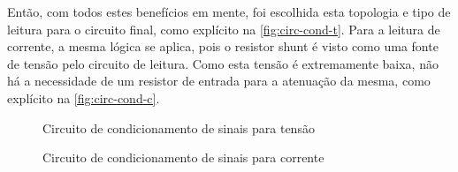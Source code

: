 Então, com todos estes benefícios em mente, foi escolhida esta topologia e tipo de leitura para o circuito final, como explícito na \autoref{fig:circ-cond-t}. Para a leitura de corrente, a mesma lógica se aplica, pois o resistor shunt é visto como uma fonte de tensão pelo circuito de leitura. Como esta tensão é extremamente baixa, não há a necessidade de um resistor de entrada para a atenuação da mesma, como explícito na \autoref{fig:circ-cond-c}.

\begin{figure}[htb!]
    \caption{Circuito de condicionamento de sinais para tensão}
    \label{fig:circ-cond-t}
    \fonte{}
\end{figure}

\begin{figure}[htb!]
    \caption{Circuito de condicionamento de sinais para corrente}
    \label{fig:circ-cond-c}
    \fonte{}
\end{figure}

